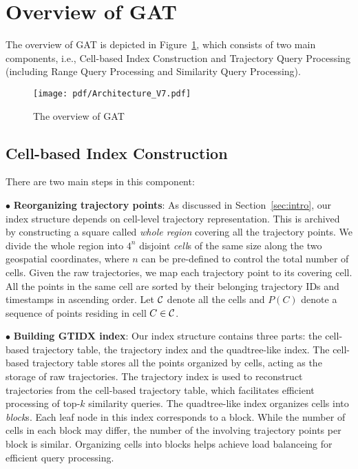 \documentclass[10pt,conference,letterpaper]{IEEEtran}
\newcommand{\frname}{GAT\xspace }
\newcommand{\idxname}{GTIDX\xspace }
\newcommand{\allcell}{{\cal C}\xspace}
\begin{document}
\section{Overview of \frname}\label{sec:framework}




The overview of \frname is depicted in Figure~\ref{fig:arch}, which consists of two main components, i.e., Cell-based Index Construction and Trajectory Query Processing (including Range Query Processing and Similarity Query Processing).

\begin{figure}[t]
	\centering
	\texttt{[image: pdf/Architecture\_V7.pdf]}
	\vspace{-.2in}
	\caption{The overview of \frname}\label{fig:arch}
	\vspace{-.1in}
\end{figure}

\subsection{Cell-based Index Construction}

There are two main steps in this component:

\vspace{0.1cm}$\bullet$ {\bf Reorganizing trajectory points}:
As discussed in Section~\ref{sec:intro}, our index structure depends on cell-level trajectory representation. This is archived by constructing a square called \emph{whole region}
covering all the trajectory points. We divide the whole region into $4^n$ disjoint \emph{cell}s of the same size along the two geospatial coordinates, where $n$ can be pre-defined to control the total number of cells. Given the raw trajectories, we map each trajectory point to its covering cell. All the points in the same cell are sorted by their belonging trajectory IDs and timestamps in ascending order. Let $\allcell$ denote all the cells and $P(C)$ denote a sequence of points residing in cell $C\in \allcell$.


\vspace{0.1cm}$\bullet$ {\bf Building \idxname index}:
Our index structure contains three parts: the cell-based trajectory table, the trajectory index and the quadtree-like index.
The cell-based trajectory table stores all the points organized by cells, acting as the storage of raw trajectories.
The trajectory index is used to reconstruct trajectories from the cell-based trajectory table, which facilitates efficient processing of top-$k$ similarity queries.
The quadtree-like index organizes cells into \emph{block}s. Each leaf node in this index corresponds to a block. While the number of cells in each block may differ, the number of the involving trajectory points per block is similar. Organizing cells into blocks helps achieve load balanceing for efficient query processing.
\end{document}
